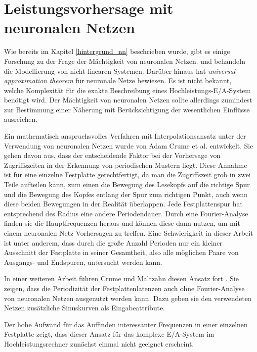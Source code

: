 \documentclass[
	12pt,
	a4paper,
	BCOR10mm,
	DIV14,
	listof=totoc,
	bibliography=totoc,
	headsepline
]{scrreprt}
\begin{document}
\section{Leistungsvorhersage mit neuronalen Netzen}

Wie bereits im Kapitel \ref{hintergrund_nn} beschrieben wurde, gibt es einige Forschung zu der Frage der Mächtigkeit von neuronalen Netzen. \cite{Rojas:1996:NNS:235222} und \cite{cybenko:mcss} behandeln die Modellierung von nicht-linearen Systemen. Darüber hinaus \cite{suykens2012artificial} hat \textit{universal approximation theorem} für neuronale Netze bewiesen. Es ist nicht bekannt, welche Komplexität für die exakte Beschreibung eines Hochleistungs-E/A-System benötigt wird. Der Mächtigkeit von neuronalen Netzen sollte allerdings zumindest zur Bestimmung einer Näherung mit Berücksichtigung der wesentlichen Einflüsse ausreichen.

Ein mathematisch anspruchsvolles Verfahren mit Interpolationsansatz unter der Verwendung von neuronalen Netzen wurde von Adam Crume et al. \cite{Crume:2013:FML:2538542.2538561} entwickelt. Sie gehen davon aus, dass der entscheidende Faktor bei der Vorhersage von Zugriffszeiten in der Erkennung von periodischen Mustern liegt. Diese Annahme ist für eine einzelne Festplatte gerechtfertigt, da man die Zugriffszeit grob in zwei Teile aufteilen kann, zum einen die Bewegung des Lesekopfs auf die richtige Spur und die Bewegung des Kopfes entlang der Spur zum richtigen Punkt, auch wenn diese beiden Bewegungen in der Realität überlappen. Jede Festplattenspur hat entsprechend des Radius eine andere Periodendauer.
Durch eine Fourier-Analyse finden sie die Hauptfrequenzen heraus und können diese dann nutzen, um mit einem neuronalen Netz Vorhersagen zu treffen.
Eine Schwierigkeit in dieser Arbeit ist unter anderem, dass durch die große Anzahl Perioden nur ein kleiner Ausschnitt der Festplatte in seiner Gesamtheit, also alle möglichen Paare von Ausgangs- und Endspuren, untersucht werden kann.

In einer weiteren Arbeit führen Crume und Maltzahn diesen Ansatz fort \cite{crumeadammaltzahncarlos2015}. Sie zeigen, dass die Periodizität der Festplattenlatenzen auch ohne Fourier-Analyse von neuronalen Netzen ausgenutzt werden kann. Dazu geben sie den verwendeten Netzen zusätzliche Sinuskurven als Eingabeattribute.

Der hohe Aufwand für das Auffinden interessanter Frequenzen in einer einzelnen Festplatte zeigt, dass dieser Ansatz für das komplexe E/A-System im Hochleistungsrechner zunächst einmal nicht geeignet erscheint.
\end{document}
